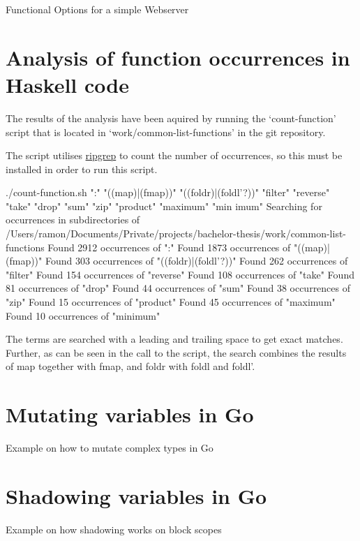 \begin{code}
    \caption{Functional Options for a simple Webserver}
\end{code}

\section{Analysis of function occurrences in Haskell code}\label{appendix:function-occurrences}
The results of the analysis have been aquired by running the `count-function' script
that is located in `work/common-list-functions' in the git repository\autocite{git-repo}.

The script utilises \href{https://github.com/BurntSushi/ripgrep}{ripgrep} to count the number of occurrences, so
this must be installed in order to run this script.

\begin{bashcode}
./count-function.sh ":" "((map)|(fmap))" "((foldr)|(foldl'?))" "filter" "reverse" "take" "drop" "sum" "zip" "product" "maximum" "min
imum"
Searching for occurrences in subdirectories of /Users/ramon/Documents/Private/projects/bachelor-thesis/work/common-list-functions
Found 2912 occurrences of ":"
Found 1873 occurrences of "((map)|(fmap))"
Found 303 occurrences of "((foldr)|(foldl'?))"
Found 262 occurrences of "filter"
Found 154 occurrences of "reverse"
Found 108 occurrences of "take"
Found 81 occurrences of "drop"
Found 44 occurrences of "sum"
Found 38 occurrences of "zip"
Found 15 occurrences of "product"
Found 45 occurrences of "maximum"
Found 10 occurrences of "minimum"
\end{bashcode}

The terms are searched with a leading and trailing space to get exact matches. Further, as can be seen in
the call to the script, the search combines the results of map together with fmap, and foldr with foldl
and foldl'.

\section{Mutating variables in Go}\label{appendix:mutation}
\begin{code}
	\caption{Example on how to mutate complex types in Go}
\end{code}

\section{Shadowing variables in Go}\label{appendix:shadowing}
\begin{code}
	\caption{Example on how shadowing works on block scopes}
\end{code}

